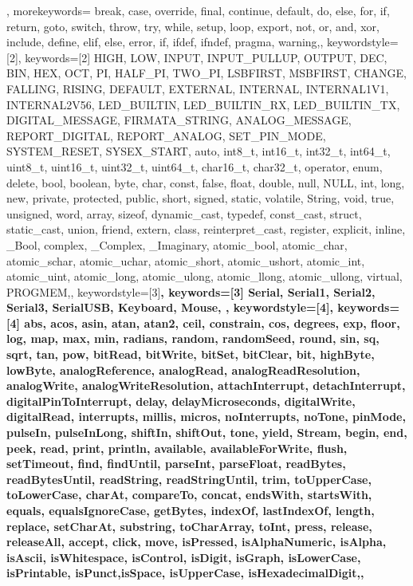 {{                }, morekeywords={   %
  break, case, override, final, continue, default, do, else, for, if, return, goto, switch, throw, try, while, setup, loop, export, not, or, and, xor, include, define, elif, else, error, if, ifdef, ifndef, pragma, warning,}, 
% 
%
  keywordstyle=[2]\color{arduinoBlue},   
  keywords=[2]{   %
HIGH, LOW, INPUT, INPUT_PULLUP, OUTPUT, DEC, BIN, HEX, OCT, PI, HALF_PI, TWO_PI, LSBFIRST, MSBFIRST, CHANGE, FALLING, RISING, DEFAULT, EXTERNAL, INTERNAL, INTERNAL1V1, INTERNAL2V56, LED_BUILTIN, LED_BUILTIN_RX, LED_BUILTIN_TX, DIGITAL_MESSAGE, FIRMATA_STRING, ANALOG_MESSAGE, REPORT_DIGITAL, REPORT_ANALOG, SET_PIN_MODE, SYSTEM_RESET, SYSEX_START, auto, int8_t, int16_t, int32_t, int64_t, uint8_t, uint16_t, uint32_t, uint64_t, char16_t, char32_t, operator, enum, delete, bool, boolean, byte, char, const, false, float, double, null, NULL, int, long, new, private, protected, public, short, signed, static, volatile, String, void, true, unsigned, word, array, sizeof, dynamic_cast, typedef, const_cast, struct, static_cast, union, friend, extern, class, reinterpret_cast, register, explicit, inline, _Bool, complex, _Complex, _Imaginary, atomic_bool, atomic_char, atomic_schar, atomic_uchar, atomic_short, atomic_ushort, atomic_int, atomic_uint, atomic_long, atomic_ulong, atomic_llong, atomic_ullong, virtual, PROGMEM,},  
% 
%
  keywordstyle=[3]\bfseries\color{arduinoOrange},
  keywords=[3]{  %
                Serial, Serial1, Serial2, Serial3, SerialUSB, Keyboard, Mouse,
                },      
%
%
  keywordstyle=[4]\color{arduinoOrange},
  keywords=[4]{  %
abs, acos, asin, atan, atan2, ceil, constrain, cos, degrees, exp, floor, log, map, max, min, radians, random, randomSeed, round, sin, sq, sqrt, tan, pow, bitRead, bitWrite, bitSet, bitClear, bit, highByte, lowByte, analogReference, analogRead, 
analogReadResolution, analogWrite, analogWriteResolution, 
attachInterrupt, detachInterrupt, digitalPinToInterrupt, delay, delayMicroseconds, digitalWrite, digitalRead, interrupts, millis, micros, noInterrupts, noTone, pinMode, pulseIn, pulseInLong, shiftIn, shiftOut, tone, yield, Stream, begin, end, peek, read, print, println, available, availableForWrite, flush, setTimeout, find, findUntil, parseInt, parseFloat, readBytes, readBytesUntil, readString, readStringUntil, trim, toUpperCase, toLowerCase, charAt, compareTo, concat, endsWith, startsWith, equals, equalsIgnoreCase, getBytes, indexOf, lastIndexOf, length, replace, setCharAt, substring, toCharArray, toInt, press, release, releaseAll, accept, click, move, isPressed, isAlphaNumeric, isAlpha, isAscii, isWhitespace, isControl, isDigit, isGraph, isLowerCase, isPrintable, isPunct,isSpace, isUpperCase, isHexadecimalDigit,},      
}
